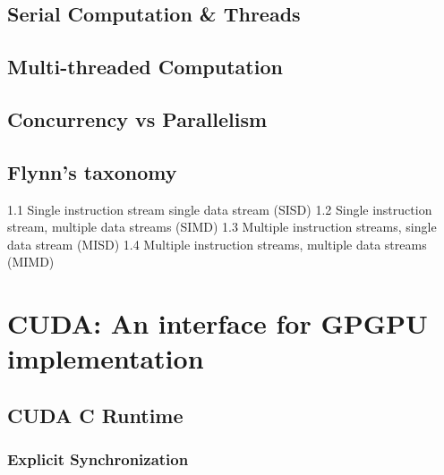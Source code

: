 \subsection{Serial Computation \& Threads}
%
\subsection{Multi-threaded Computation}
%
\subsection{Concurrency vs Parallelism}
%
\subsection{Flynn's taxonomy}
1.1	Single instruction stream single data stream (SISD)
1.2	Single instruction stream, multiple data streams (SIMD)
1.3	Multiple instruction streams, single data stream (MISD)
1.4	Multiple instruction streams, multiple data streams (MIMD)
%
\section{CUDA: An interface for GPGPU implementation}
\subsection{CUDA C Runtime}%
\subsubsection{Explicit Synchronization}%

